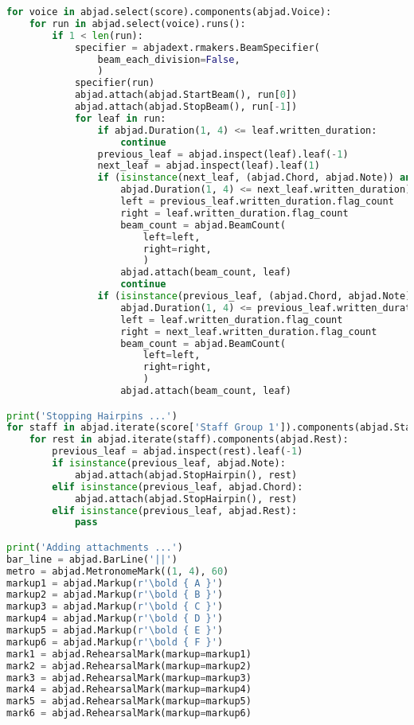 \begin{lstlisting}[language=Python, caption=Four Ages of Sand Segment\_III]
for voice in abjad.select(score).components(abjad.Voice):
    for run in abjad.select(voice).runs():
        if 1 < len(run):
            specifier = abjadext.rmakers.BeamSpecifier(
                beam_each_division=False,
                )
            specifier(run)
            abjad.attach(abjad.StartBeam(), run[0])
            abjad.attach(abjad.StopBeam(), run[-1])
            for leaf in run:
                if abjad.Duration(1, 4) <= leaf.written_duration:
                    continue
                previous_leaf = abjad.inspect(leaf).leaf(-1)
                next_leaf = abjad.inspect(leaf).leaf(1)
                if (isinstance(next_leaf, (abjad.Chord, abjad.Note)) and
                    abjad.Duration(1, 4) <= next_leaf.written_duration):
                    left = previous_leaf.written_duration.flag_count
                    right = leaf.written_duration.flag_count
                    beam_count = abjad.BeamCount(
                        left=left,
                        right=right,
                        )
                    abjad.attach(beam_count, leaf)
                    continue
                if (isinstance(previous_leaf, (abjad.Chord, abjad.Note)) and
                    abjad.Duration(1, 4) <= previous_leaf.written_duration):
                    left = leaf.written_duration.flag_count
                    right = next_leaf.written_duration.flag_count
                    beam_count = abjad.BeamCount(
                        left=left,
                        right=right,
                        )
                    abjad.attach(beam_count, leaf)

print('Stopping Hairpins ...')
for staff in abjad.iterate(score['Staff Group 1']).components(abjad.Staff):
    for rest in abjad.iterate(staff).components(abjad.Rest):
        previous_leaf = abjad.inspect(rest).leaf(-1)
        if isinstance(previous_leaf, abjad.Note):
            abjad.attach(abjad.StopHairpin(), rest)
        elif isinstance(previous_leaf, abjad.Chord):
            abjad.attach(abjad.StopHairpin(), rest)
        elif isinstance(previous_leaf, abjad.Rest):
            pass

print('Adding attachments ...')
bar_line = abjad.BarLine('||')
metro = abjad.MetronomeMark((1, 4), 60)
markup1 = abjad.Markup(r'\bold { A }')
markup2 = abjad.Markup(r'\bold { B }')
markup3 = abjad.Markup(r'\bold { C }')
markup4 = abjad.Markup(r'\bold { D }')
markup5 = abjad.Markup(r'\bold { E }')
markup6 = abjad.Markup(r'\bold { F }')
mark1 = abjad.RehearsalMark(markup=markup1)
mark2 = abjad.RehearsalMark(markup=markup2)
mark3 = abjad.RehearsalMark(markup=markup3)
mark4 = abjad.RehearsalMark(markup=markup4)
mark5 = abjad.RehearsalMark(markup=markup5)
mark6 = abjad.RehearsalMark(markup=markup6)


\end{lstlisting}
